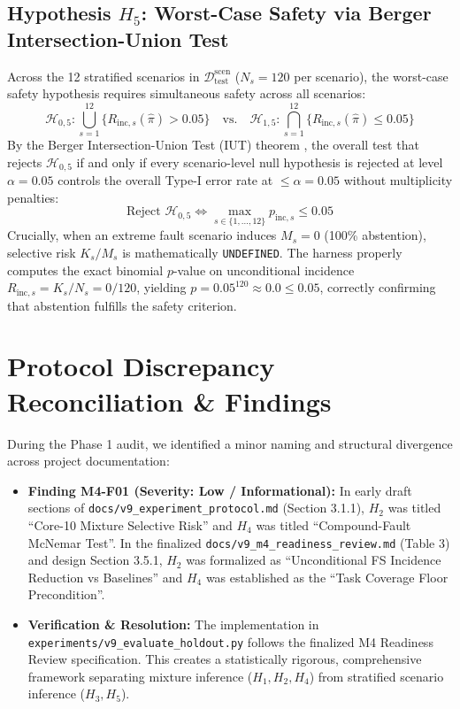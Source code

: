 \documentclass[10pt,a4paper]{article}
\begin{document}
\subsection{Hypothesis $H_5$: Worst-Case Safety via Berger Intersection-Union Test}
Across the 12 stratified scenarios in $\mathcal{D}_{\mathrm{test}}^{\mathrm{scen}}$ ($N_s = 120$ per scenario), the worst-case safety hypothesis requires simultaneous safety across all scenarios:
\begin{equation}
\mathcal{H}_{0,5}: \bigcup_{s=1}^{12} \big\{R_{\mathrm{inc}, s}(\hat{\pi}) > 0.05\big\} \quad\text{vs.}\quad \mathcal{H}_{1,5}: \bigcap_{s=1}^{12} \big\{R_{\mathrm{inc}, s}(\hat{\pi}) \le 0.05\big\}
\end{equation}
By the Berger Intersection-Union Test (IUT) theorem \cite{berger1982}, the overall test that rejects $\mathcal{H}_{0,5}$ if and only if every scenario-level null hypothesis is rejected at level $\alpha = 0.05$ controls the overall Type-I error rate at $\le \alpha = 0.05$ without multiplicity penalties:
\begin{equation}
\text{Reject } \mathcal{H}_{0,5} \iff \max_{s \in \{1, \dots, 12\}} p_{\mathrm{inc}, s} \le 0.05
\end{equation}
Crucially, when an extreme fault scenario induces $M_s = 0$ (100\% abstention), selective risk $K_s / M_s$ is mathematically \texttt{UNDEFINED}. The harness properly computes the exact binomial $p$-value on unconditional incidence $R_{\mathrm{inc}, s} = K_s / N_s = 0/120$, yielding $p = 0.05^{120} \approx 0.0 \le 0.05$, correctly confirming that abstention fulfills the safety criterion.

\section{Protocol Discrepancy Reconciliation \& Findings}
During the Phase 1 audit, we identified a minor naming and structural divergence across project documentation:
\begin{itemize}
    \item \textbf{Finding M4-F01 (Severity: Low / Informational):} In early draft sections of \texttt{docs/v9\_experiment\_protocol.md} (Section 3.1.1), $H_2$ was titled ``Core-10 Mixture Selective Risk'' and $H_4$ was titled ``Compound-Fault McNemar Test''. In the finalized \texttt{docs/v9\_m4\_readiness\_review.md} (Table 3) and design Section 3.5.1, $H_2$ was formalized as ``Unconditional FS Incidence Reduction vs Baselines'' and $H_4$ was established as the ``Task Coverage Floor Precondition''.
    \item \textbf{Verification \& Resolution:} The implementation in \texttt{experiments/v9\_evaluate\_holdout.py} follows the finalized M4 Readiness Review specification. This creates a statistically rigorous, comprehensive framework separating mixture inference ($H_1, H_2, H_4$) from stratified scenario inference ($H_3, H_5$).
\end{itemize}
\end{document}

